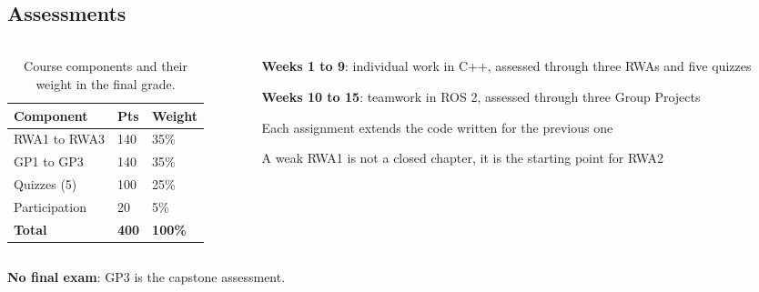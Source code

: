 \documentclass[
    10pt,
    dvipsnames,
    svgnames,
    x11names,
    aspectratio=1610,
    english,
    codeminted]{beamer}
\begin{document}
\subsection*{Assessments}
\begingroup
\divframetrue
\renewcommand{\divbartextA}{\secname}
\renewcommand{\divbartextB}{}
\begin{frame}{\secname}
  \divbar{\secname}{\subsecname}
  \framesubtitle{\subsecname}
  
\begin{columns}[T,onlytextwidth]
\begin{column}{0.48\textwidth}
\begin{table}[h]
\caption{Course components and their weight in the final grade.}
\footnotesize\centering
\renewcommand{\arraystretch}{1.2}
\begin{tabular}{m{2.9cm}m{1.1cm}m{1.1cm}}
  \toprule
  \textbf{Component} & \textbf{Pts} & \textbf{Weight} \\
  \midrule
  RWA1 to RWA3           & 140 & 35\% \\
  GP1 to GP3             & 140 & 35\% \\
  Quizzes (5)            & 100 & 25\% \\
  Participation          & 20  & 5\% \\
  \midrule
  \rowcolor{white}
  \textbf{Total}         & \textbf{400} & \textbf{100\%} \\
  \bottomrule
\end{tabular}
\end{table}
\end{column}
\begin{column}{0.48\textwidth}
\begin{compactitem}
\small
    \item \textbf{Weeks 1 to 9}: individual work in C++, assessed through three RWAs and five quizzes
    \item \textbf{Weeks 10 to 15}: teamwork in ROS 2, assessed through three Group Projects
\end{compactitem}

\medskip
{}
\begin{compactitem}
\small
    \item Each assignment extends the code written for the previous one
    \item A weak RWA1 is not a closed chapter, it is the starting point for RWA2
\end{compactitem}
\end{column}
\end{columns}

\medskip
\begin{MyBox}
\textbf{No final exam}: GP3 is the capstone assessment.
\end{MyBox}
\end{frame}
\endgroup
\end{document}
